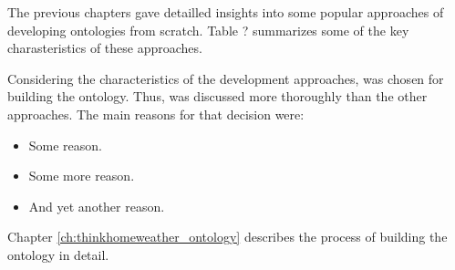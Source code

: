 The previous chapters gave detailled insights into some popular approaches of developing ontologies from scratch. Table ? summarizes some of the key charasteristics of these approaches.


Considering the characteristics of the development approaches, \methontology was chosen for building the \thinkhomeweather ontology. Thus, \methontology was discussed more thoroughly than the other approaches. The main reasons for that decision were:

\begin{itemize}
  \item Some reason.
  \item Some more reason.
  \item And yet another reason.
\end{itemize}

Chapter \ref{ch:thinkhomeweather_ontology} describes the process of building the \thinkhomeweather ontology in detail.